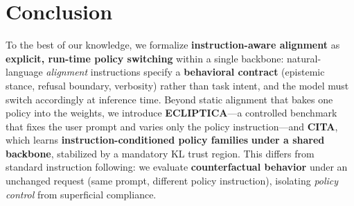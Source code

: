 \documentclass[11pt]{article}
\begin{document}







\section{Conclusion}
\label{sec:conclusion}

To the best of our knowledge, we formalize \textbf{instruction-aware alignment} as \textbf{explicit, run-time policy switching} within a single backbone: natural-language \emph{alignment} instructions specify a \textbf{behavioral contract} (epistemic stance, refusal boundary, verbosity) rather than task intent, and the model must switch accordingly at inference time. Beyond static alignment that bakes one policy into the weights, we introduce \textbf{ECLIPTICA}—a controlled benchmark that fixes the user prompt and varies only the policy instruction—and \textbf{CITA}, which learns \textbf{instruction-conditioned policy families} \textbf{under a shared backbone}, stabilized by a mandatory KL trust region. This differs from standard instruction following: we evaluate \textbf{counterfactual behavior} under an unchanged request (same prompt, different policy instruction), isolating \emph{policy control} from superficial compliance.












\clearpage
\newpage


\clearpage
\newpage
\end{document}
